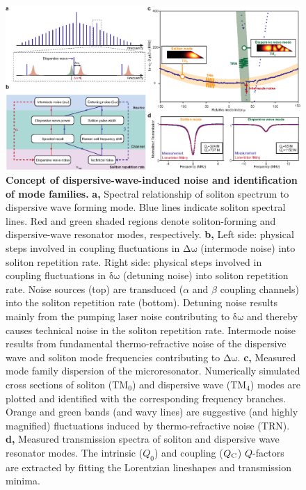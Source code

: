 \documentclass[noshowpacs,amsmath,
twocolumn,
superscriptaddress,
8pt,
aps,prb]{revtex4-2}
\begin{document}
\begin{figure}[t]
\includegraphics[width=\linewidth]{Fig4.eps}
\caption{{\bf Concept of dispersive-wave-induced noise and identification of mode families.} {\bf a,} Spectral relationship of soliton spectrum to dispersive wave forming mode. Blue lines indicate soliton spectral lines. Red and green shaded regions denote soliton-forming and dispersive-wave resonator modes, respectively. {\bf b,} Left side: physical steps involved in coupling fluctuations in $\mathrm{\Delta \omega}$ (intermode noise) into soliton repetition rate. Right side: physical steps involved in coupling fluctuations in $\mathrm{\delta \omega}$ (detuning noise) into soliton repetition rate. Noise sources (top) are transduced ($\alpha$ and $\beta$ coupling channels) into the soliton repetition rate (bottom). Detuning noise results mainly from the pumping laser noise contributing to $\mathrm{\delta \omega}$ and thereby causes technical noise in the soliton repetition rate.  Intermode noise results from fundamental thermo-refractive noise of the dispersive wave and soliton mode frequencies contributing to $\mathrm{\Delta \omega}$.    {\bf c,} Measured mode family dispersion of the microresonator. Numerically simulated cross sections of soliton (TM$_0$) and dispersive wave (TM$_4$) modes are plotted and identified with the corresponding frequency branches. Orange and green bands (and wavy lines) are suggestive (and highly magnified) fluctuations induced by thermo-refractive noise (TRN). {\bf d,} Measured transmission spectra of soliton and dispersive wave resonator modes. The intrinsic ($Q_0$) and coupling ($Q_{\rm C}$) $Q$-factors are extracted by fitting the Lorentzian lineshapes and transmission minima.}
\label{figure4}
\end{figure}
\end{document}

